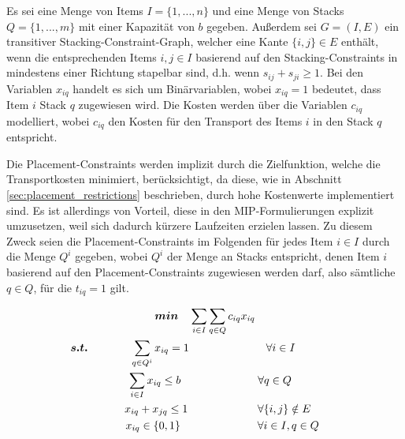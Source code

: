 Es sei eine Menge von Items $I = \{1, ..., n\}$ und eine Menge von Stacks $Q = \{1, ..., m\}$ mit einer Kapazität von $b$ gegeben.
Außerdem sei $G = (I, E)$ ein transitiver Stacking-Constraint-Graph, welcher eine Kante $\{i, j\} \in E$ enthält,
wenn die entsprechenden Items $i, j \in I$ basierend auf den Stacking-Constraints in mindestens einer Richtung stapelbar sind,
d.h. wenn $s_{ij} + s_{ji} \geq 1$.\newline
Bei den Variablen $x_{iq}$ handelt es sich um Binärvariablen, wobei $x_{iq} = 1$ bedeutet, dass Item $i$ Stack $q$ zugewiesen wird.
Die Kosten werden über die Variablen $c_{iq}$ modelliert, wobei $c_{iq}$ den Kosten für den Transport des Items $i$ in den Stack $q$
entspricht.

Die Placement-Constraints werden implizit durch die Zielfunktion, welche die Transportkosten minimiert, berücksichtigt,
da diese, wie in Abschnitt \ref{sec:placement_restrictions} beschrieben, durch hohe Kostenwerte implementiert sind.
Es ist allerdings von Vorteil, diese in den MIP-Formulierungen explizit umzusetzen, weil sich dadurch kürzere
Laufzeiten erzielen lassen. Zu diesem Zweck seien die Placement-Constraints im Folgenden für jedes Item $i \in I$
durch die Menge $Q^i$ gegeben, wobei $Q^i$ der Menge an Stacks entspricht, denen Item $i$ basierend auf den Placement-Constraints zugewiesen werden darf, also sämtliche $q \in Q$, für die $t_{iq} = 1$ gilt.

\begin{gather}
\boldsymbol{min} \quad \sum_{i \in I} \sum_{q \in Q} c_{iq} x_{iq} \label{bin_packing_line_one} \\
\thinspace\thinspace \boldsymbol{s.t.} \thinspace\quad\thinspace\thinspace\thinspace\quad\thinspace \quad \sum_{q \in Q^i} x_{iq} = 1 \quad\quad\quad\quad\quad\quad\quad \forall i \in I \quad\quad\quad\quad\thinspace\thinspace \label{bin_packing_line_two} \\
\quad \sum_{i \in I} x_{iq} \leq b \quad\quad\quad\quad\quad\quad\quad \forall q \in Q \label{bin_packing_line_three} \\
\thinspace\thinspace\quad\quad x_{iq} + x_{jq} \leq 1 \quad\quad\thinspace\thinspace\quad\quad\quad\quad \forall \{i, j\} \notin E \label{bin_packing_line_four} \\
\thinspace\thinspace\quad\quad\quad x_{iq} \in \{0, 1\} \thinspace\thinspace\thinspace\thinspace\thinspace\thinspace\quad\quad\quad\quad\quad\quad \forall i \in I, q \in Q \thinspace \label{bin_packing_line_five}
\end{gather}

